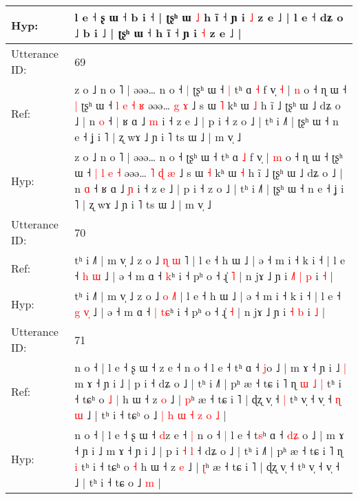 \documentclass[10pt]{article}
\DeclareRobustCommand{\hl}[1]{{\textcolor{red}{#1}}}
\begin{document}
\begin{longtable}{ll}
 \\
Hyp: & l e ˧ ʂ ɯ ˧ b i ˧ | ʈʂʰ ɯ\hl{}\hl{} \hl{˩} h ĩ ˧ ɲ i \hl{˩} z e ˩ | l e ˧ dʑ o ˩ b i ˩ | ʈʂʰ ɯ ˧\hl{}\hl{} h ĩ ˧ ɲ i \hl{˧} z e ˩ |
 \\
\midrule
Utterance ID: & 69 \\
Ref: & z o ˩ n o ˥ | əəə… n o ˧\hl{ }\hl{|} ʈʂʰ ɯ ˧\hl{ }\hl{|} tʰ ɑ \hl{˧} f v̩\hl{ }\hl{˧} | \hl{n} o ˧ ɳ ɯ ˧\hl{ }\hl{|} ʈʂʰ ɯ ˧ \hl{l} \hl{e} \hl{˧} \hl{ʁ} əəə…\hl{}\hl{} \hl{g} \hl{ɤ} ˩ s ɯ \hl{˥} kʰ ɯ \hl{˩} h ĩ ˩ ʈʂʰ ɯ ˩ dʑ o ˩ | n \hl{o} ˧\hl{ }\hl{|} ʁ ɑ ˩ \hl{m} i ˧ z e ˩ | p i ˧ z o ˩ | tʰ i ˩˥ | ʈʂʰ ɯ ˧ n e ˧ ʝ i ˥ | ʐ wɤ ˩ ɲ i ˥ ts ɯ ˩ | m v̩ ˩
 \\
Hyp: & z o ˩ n o ˥ | əəə… n o ˧\hl{}\hl{} ʈʂʰ ɯ ˧\hl{}\hl{} tʰ ɑ \hl{˩} f v̩\hl{}\hl{} | \hl{m} o ˧ ɳ ɯ ˧\hl{}\hl{} ʈʂʰ ɯ ˧ \hl{|} \hl{l} \hl{e} \hl{˧} əəə…\hl{ }\hl{˥} \hl{ɖ} \hl{æ} ˩ s ɯ \hl{˧} kʰ ɯ \hl{˧} h ĩ ˩ ʈʂʰ ɯ ˩ dʑ o ˩ | n \hl{ɑ} ˧\hl{}\hl{} ʁ ɑ ˩ \hl{ɲ} i ˧ z e ˩ | p i ˧ z o ˩ | tʰ i ˩˥ | ʈʂʰ ɯ ˧ n e ˧ ʝ i ˥ | ʐ wɤ ˩ ɲ i ˥ ts ɯ ˩ | m v̩ ˩
 \\
\midrule
Utterance ID: & 70 \\
Ref: & tʰ i ˩˥ | m v̩ ˩ z o ˩ \hl{ɳ} \hl{ɯ}\hl{ }˥ | l e ˧ h ɯ ˩ | ə ˧ m i ˧ k i ˧ | l e ˧ \hl{h} \hl{}\hl{ɯ} ˩ | ə ˧ m ɑ ˧\hl{}\hl{} \hl{}\hl{k}ʰ i ˧ pʰ o ˧ ɻ̍ \hl{˥} | n jɤ ˩ ɲ i\hl{ }\hl{˩}\hl{˥} \hl{|} \hl{p} i \hl{˧} |
 \\
Hyp: & tʰ i ˩˥ | m v̩ ˩ z o ˩ \hl{o} \hl{}\hl{˩}˥ | l e ˧ h ɯ ˩ | ə ˧ m i ˧ k i ˧ | l e ˧ \hl{g} \hl{v}\hl{̩} ˩ | ə ˧ m ɑ ˧\hl{ }\hl{|} \hl{t}\hl{ɕ}ʰ i ˧ pʰ o ˧ ɻ̍ \hl{˧} | n jɤ ˩ ɲ i\hl{}\hl{}\hl{} \hl{˧} \hl{b} i \hl{˩} |
 \\
\midrule
Utterance ID: & 71 \\
Ref: & n o ˧ | l e ˧ ʂ ɯ ˧ \hl{}z e ˧\hl{}\hl{} n o ˧\hl{}\hl{} l e ˧ t\hl{}ʰ ɑ ˧ \hl{}\hl{}\hl{j}o ˩ | m ɤ ˧ ɲ i ˩\hl{ }\hl{|} m ɤ ˧ ɲ i ˩ | p i\hl{}\hl{}\hl{}\hl{} ˧ dʑ o ˩ | tʰ i ˩˥ | pʰ æ ˧ tɕ i ˥ ɳ\hl{ }\hl{ɯ}\hl{ }\hl{˩} \hl{|} tʰ i ˧ tɕʰ o\hl{ }\hl{˩} \hl{|} h ɯ ˧ z \hl{o} ˩ | \hl{p}ʰ æ ˧ tɕ i ˥ | ɖʐ v̩ ˧\hl{ }\hl{|} tʰ v̩ ˧ v̩ ˧\hl{ }\hl{ɳ}\hl{ }\hl{ɯ} ˩ | tʰ i ˧ tɕ\hl{ʰ} o ˩\hl{ }\hl{|}\hl{ }\hl{h}\hl{ }\hl{ɯ}\hl{ }\hl{˧}\hl{ }\hl{z}\hl{ }\hl{o} \hl{˩} |
 \\
Hyp: & n o ˧ | l e ˧ ʂ ɯ ˧ \hl{d}z e ˧\hl{ }\hl{|} n o ˧\hl{ }\hl{|} l e ˧ t\hl{s}ʰ ɑ ˧ \hl{d}\hl{ʑ}\hl{ }o ˩ | m ɤ ˧ ɲ i ˩\hl{}\hl{} m ɤ ˧ ɲ i ˩ | p i\hl{ }\hl{˧}\hl{ }\hl{l} ˧ dʑ o ˩ | tʰ i ˩˥ | pʰ æ ˧ tɕ i ˥ ɳ\hl{}\hl{}\hl{}\hl{} \hl{i} tʰ i ˧ tɕʰ o\hl{}\hl{} \hl{˧} h ɯ ˧ z \hl{e} ˩ | \hl{ʈ}ʰ æ ˧ tɕ i ˥ | ɖʐ v̩ ˧\hl{}\hl{} tʰ v̩ ˧ v̩ ˧\hl{}\hl{}\hl{}\hl{} ˩ | tʰ i ˧ tɕ\hl{} o ˩\hl{}\hl{}\hl{}\hl{}\hl{}\hl{}\hl{}\hl{}\hl{}\hl{}\hl{}\hl{} \hl{m} |

\end{longtable}
\end{document}
